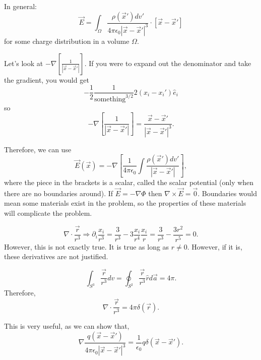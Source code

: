 \documentclass[a4paper,twoside,master.tex]{subfiles}
\begin{document}
In general:
\begin{equation}
    \vec{E} = \int_\Omega\frac{\rho(\vec{x}')dv'}{4\pi\epsilon_0|\vec{x}-\vec{x}'|^3}\cdot\left[\vec{x}-\vec{x}'\right]
\end{equation} for some charge distribution in a volume $\Omega$.

Let's look at $-\nabla\left[\frac{1}{|\vec{x}-\vec{x}'|}\right]$. If you were to expand out the denominator and take the gradient, you would get
\begin{equation}
    -\frac{1}{2}\frac{1}{\text{something}^{3/2}}2(x_i - x_i')\hat{e}_i
\end{equation}
so
\begin{equation}
    -\nabla\left[\frac{1}{|\vec{x}-\vec{x}'|}\right] = \frac{\vec{x} - \vec{x}'}{|\vec{x}-\vec{x}'|^3}.
\end{equation}

Therefore, we can use
\begin{equation}
    \vec{E}(\vec{x}) = -\nabla\left[\frac{1}{4\pi\epsilon_0}\int\frac{\rho(\vec{x}')dv'}{|\vec{x} - \vec{x}'|}\right],
\end{equation}
where the piece in the brackets is a scalar, called the scalar potential (only when there are no boundaries around). If $\vec{E}=-\nabla\Phi$ then $\nabla\times\vec{E}=\vec{0}$. Boundaries would mean some materials exist in the problem, so the properties of these materials will complicate the problem.

\begin{remark}
    \begin{equation}
        \nabla\cdot\frac{\vec{r}}{r^3} \Rightarrow \partial_i\frac{x_i}{r^3} = \frac{3}{r^3}-3\frac{x_i}{r^4}\frac{x_i}{r} = \frac{3}{r^3} - \frac{3r^2}{r^5} = 0.
    \end{equation}
However, this is not exactly true. It is true as long as $r\neq 0$. However, if it is, these derivatives are not justified.
\end{remark}

\begin{equation}
  \int_{S^3}\frac{\vec{r}}{r^3}dv = \oint_{S^2}\frac{\vec{r}}{r^3}\hat{r}d\vec{a} = 4\pi. 
\end{equation}
Therefore,
\begin{equation}
    \nabla\cdot\frac{\vec{r}}{r^3} = 4\pi\delta(\vec{r}).
\end{equation}

This is very useful, as we can show that,
\begin{equation}
    \nabla\frac{q(\vec{x}-\vec{x}')}{4\pi\epsilon_0|\vec{x}-\vec{x}'|^3} = \frac{1}{\epsilon_0}q\delta(\vec{x}-\vec{x}').
\end{equation}
\end{document}
